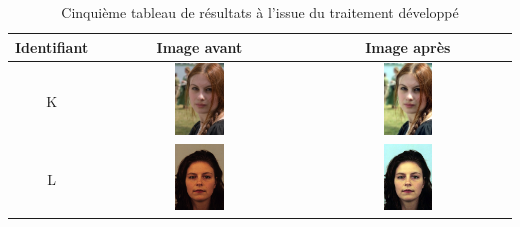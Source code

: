 \documentclass[11pt, french]{report-rd-info}
\begin{document}
\begin{table}
\centering
\begin{tabular}{|c|c|c|}	
   \hline \textbf{Identifiant}  &  \textbf{Image avant}  &  \textbf{Image après} \\ \hline 
   K & \includegraphics[width=0.25\textwidth]{Resultats/pk_avant} & \includegraphics[width=0.25\textwidth]{Resultats/pk_apres} \\ \hline   
   L & \includegraphics[width=0.25\textwidth]{Resultats/pl_avant} & \includegraphics[width=0.25\textwidth]{Resultats/pl_apres} \\ \hline   
\end{tabular}
\caption{Cinquième tableau de résultats à l'issue du traitement développé}
\label{tab:Resultats5}
\end{table}
\end{document}
